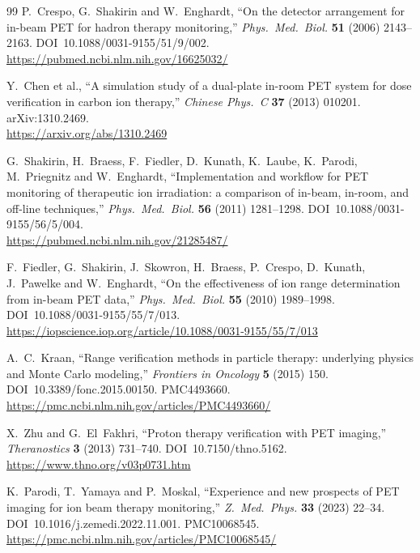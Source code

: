 \documentclass[11pt]{article}
\begin{document}
\begin{thebibliography}{99}
P.~Crespo, G.~Shakirin and W.~Enghardt,
``On the detector arrangement for in-beam PET for hadron therapy monitoring,''
\textit{Phys.\ Med.\ Biol.} \textbf{51} (2006) 2143--2163.
DOI~10.1088/0031-9155/51/9/002.\\
\url{https://pubmed.ncbi.nlm.nih.gov/16625032/}

Y.~Chen et al.,
``A simulation study of a dual-plate in-room PET system for dose verification in
carbon ion therapy,''
\textit{Chinese Phys.\ C} \textbf{37} (2013) 010201. arXiv:1310.2469.\\
\url{https://arxiv.org/abs/1310.2469}

G.~Shakirin, H.~Braess, F.~Fiedler, D.~Kunath, K.~Laube, K.~Parodi, M.~Priegnitz
and W.~Enghardt,
``Implementation and workflow for PET monitoring of therapeutic ion irradiation:
a comparison of in-beam, in-room, and off-line techniques,''
\textit{Phys.\ Med.\ Biol.} \textbf{56} (2011) 1281--1298.
DOI~10.1088/0031-9155/56/5/004.\\
\url{https://pubmed.ncbi.nlm.nih.gov/21285487/}

F.~Fiedler, G.~Shakirin, J.~Skowron, H.~Braess, P.~Crespo, D.~Kunath, J.~Pawelke
and W.~Enghardt,
``On the effectiveness of ion range determination from in-beam PET data,''
\textit{Phys.\ Med.\ Biol.} \textbf{55} (2010) 1989--1998.
DOI~10.1088/0031-9155/55/7/013.\\
\url{https://iopscience.iop.org/article/10.1088/0031-9155/55/7/013}

A.~C.~Kraan,
``Range verification methods in particle therapy: underlying physics and Monte
Carlo modeling,''
\textit{Frontiers in Oncology} \textbf{5} (2015) 150.
DOI~10.3389/fonc.2015.00150. PMC4493660.\\
\url{https://pmc.ncbi.nlm.nih.gov/articles/PMC4493660/}

X.~Zhu and G.~El~Fakhri,
``Proton therapy verification with PET imaging,''
\textit{Theranostics} \textbf{3} (2013) 731--740. DOI~10.7150/thno.5162.\\
\url{https://www.thno.org/v03p0731.htm}

K.~Parodi, T.~Yamaya and P.~Moskal,
``Experience and new prospects of PET imaging for ion beam therapy monitoring,''
\textit{Z.\ Med.\ Phys.} \textbf{33} (2023) 22--34.
DOI~10.1016/j.zemedi.2022.11.001. PMC10068545.\\
\url{https://pmc.ncbi.nlm.nih.gov/articles/PMC10068545/}


\end{thebibliography}
\end{document}
